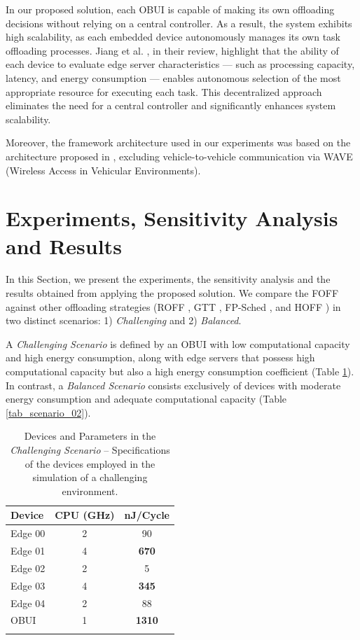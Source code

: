 \documentclass[iicol]{sn-jnl}
\begin{document}
In our proposed solution, each OBUI is capable of making its own offloading decisions without relying on a central controller. As a result, the system exhibits high scalability, as each embedded device autonomously manages its own task offloading processes. Jiang et al. \cite{jiang2019toward}, in their review, highlight that the ability of each device to evaluate edge server characteristics — such as processing capacity, latency, and energy consumption — enables autonomous selection of the most appropriate resource for executing each task. This decentralized approach eliminates the need for a central controller and significantly enhances system scalability.

Moreover, the framework architecture used in our experiments was based on the architecture proposed in \cite{de2021context}, excluding vehicle-to-vehicle communication via WAVE (Wireless Access in Vehicular Environments).

\section{Experiments, Sensitivity Analysis and Results}\label{sec_experiments}

In this Section, we present the experiments, the sensitivity analysis and the results obtained from applying the proposed solution. We compare the FOFF against other offloading strategies (ROFF \cite{de2021context}, GTT \cite{de2021context}, FP-Sched \cite{10757894}, and HOFF \cite{sadatdiynov2023intelligent}) in two distinct scenarios: 1) \textit{Challenging} and 2) \textit{Balanced}. 

A \textit{Challenging Scenario} is defined by an OBUI with low computational capacity and high energy consumption, along with edge servers that possess high computational capacity but also a high energy consumption coefficient (Table \ref{tab_scenario_01}). In contrast, a \textit{Balanced Scenario} consists exclusively of devices with moderate energy consumption and adequate computational capacity (Table \ref{tab_scenario_02}).


\begin{table}[ht!]
    \centering
    \caption{Devices and Parameters in the \textit{Challenging Scenario} – Specifications of the devices employed in the simulation of a challenging environment.}
    \label{tab_scenario_01}
    \begin{tabular}{lcc}
    \toprule
    \textbf{Device} & \textbf{CPU (GHz)} & \textbf{nJ/Cycle} \\
    \midrule
    Edge 00 & 2 &  90\\
    Edge 01 & 4 & \textbf{670}\\
    Edge 02 & 2 & 5\\
    Edge 03 & 4 & \textbf{345}\\
    Edge 04 & 2 & 88\\
    OBUI    & 1 & \textbf{1310}\\
    \botrule
    \end{tabular}
\end{table}
\end{document}
